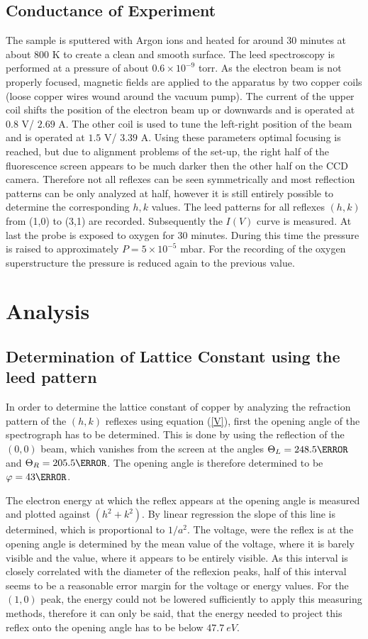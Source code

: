 \documentclass[a4paper]{scrartcl}
\numberwithin{equation}{section}
\numberwithin{figure}{section}
\numberwithin{table}{section}
\newcommand{\Formel}[1]{(\ref{#1})}
\begin{document}
\subsection{Conductance of Experiment}
\label{sec:experiment}
The sample is sputtered with Argon ions and heated for around 30 minutes at about 800 K to create a clean and smooth surface. The leed spectroscopy is performed at a pressure of about $0.6 \times 10^{-9}$ torr. As the electron beam is not properly focused, magnetic fields are applied to the apparatus by two copper coils (loose copper wires wound around the vacuum pump). The current of the upper coil shifts the position of the electron beam up or downwards and is operated at $0.8$ V/ $2.69$ A. The other coil is used to tune the left-right position of the beam and is operated at $1.5$ V/ $3.39$ A. Using these parameters optimal focusing is reached, but due to alignment problems of the set-up, the right half of the fluorescence screen appears to be much darker then the other half on the CCD camera. Therefore not all reflexes can be seen symmetrically and most reflection patterns can be only analyzed at half, however it is still entirely possible to determine the corresponding $h,k$ values. The leed patterns for all reflexes $(h,k)$ from (1,0) to (3,1) are recorded. Subsequently the $I(V)$ curve is measured. At last the probe is exposed to oxygen for 30 minutes. During this time the pressure is raised to approximately $P=5 \times 10^{-5}$ mbar. For the recording of the oxygen superstructure the pressure is reduced again to the previous value.

\clearpage
\section{Analysis}
\subsection{Determination of Lattice Constant using the leed pattern}
In order to determine the lattice constant of copper by analyzing the refraction pattern of the $(h,k)$ reflexes using equation \Formel{V}, first the opening angle of the spectrograph has to be determined. This is done by using the reflection of the $(0,0)$ beam, which vanishes from the screen at the angles $\Theta_L = 248.5 \degree$ and $\Theta_R=205.5 \degree$. The opening angle is therefore determined to be $\varphi=43 \degree$. 

The electron energy at which the reflex appears at the opening angle is measured and plotted against $(h^2+k^2)$. By linear regression the slope of this line is determined, which is proportional to $ 1/a^2 $. The voltage, were the reflex is at the opening angle is determined by the mean value of the voltage, where it is barely visible and the value, where it appears to be entirely visible. As this interval is closely correlated with the diameter of the reflexion peaks, half of this interval seems to be a reasonable error margin for the voltage or energy  values. For the $(1,0)$ peak, the energy could not be lowered sufficiently to apply this measuring methods, therefore it can only be said, that the energy needed to project this reflex onto the opening angle has to be below $\SI{47.7}{eV}$. 
\end{document}
